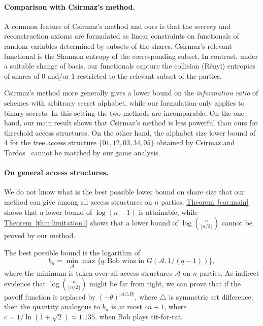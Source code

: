 \documentclass[11pt]{article}
\numberwithin{equation}{section}
\theoremstyle{definition}
\theoremstyle{plain}
\newcommand{\expref}[2]{\hyperref[#2]{#1~\ref{#2}}}
\def\calA{\mathcal{A}}
\providecommand\floor[1]{\lfloor#1\rfloor}
\providecommand\abs[1]{\lvert#1\rvert}
\begin{document}
\paragraph{Comparison with Csirmaz's method.}
A common feature of Csirmaz's method and ours is that the secrecy and reconstruction axioms are formulated as linear constraints on functionals of random variables determined by subsets of the shares.  Csirmaz's relevant functional is the Shannon entropy of the corresponding subset.  In contrast, under a suitable change of basis, our functionals capture the collision (R{\'e}nyi) entropies of shares of 0 and/or 1 restricted to the relevant subset of the parties.  

Csirmaz's method more generally gives a lower bound on  
the \emph{information ratio} of schemes with arbitrary secret alphabet, while our formulation only applies to binary secrets.  In this setting the two methods are incomparable.  On the one hand, our main result shows that Csirmaz's method is less powerful than ours for threshold access structures.  On the other hand, the alphabet size lower bound of 4 for the tree access structure $\{01, 12, 03, 34, 05\}$ obtained by Csirmaz and Tardos~\cite{csirmaz-tardos} cannot be matched by our game analysis.


\paragraph{On general access structures.}
We do not know what is the best possible lower bound on share size that our method can give among all access structures on $n$ parties.  \expref{Theorem}{cor:main} shows that a lower bound of $\log (n - 1)$ is attainable, while \expref{Theorem}{thm:limitation1} shows that a lower bound of $\log\binom{n}{\floor{n/2}}$ 
cannot be proved by our method. 

The best possible bound is the logarithm of
\[ b_n = \min_\text{$\calA$} \max \bigl\{q\colon \text{Bob wins in $G(\calA, 1/(q-1))$}\bigr\}, \]
where the minimum is taken over all access structures $\calA$ on $n$ parties.  As indirect evidence that $\log\binom{n}{\floor{n/2}}$  might be far from tight, we can prove that if the payoff function is replaced by $(-\theta)^{\abs{A \triangle B}}$, where $\triangle$ is symmetric set difference, then the quantity analogous to $b_n$ is at most 
$cn + 1$, where $c = 1/\ln(1 + \sqrt{2}) \approx 1.135$, 
when Bob plays tit-for-tat.
\end{document}
